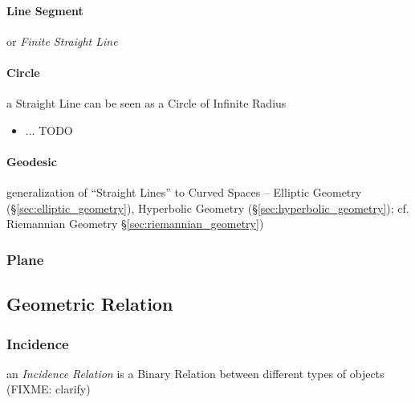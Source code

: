 \paragraph{Line Segment}\label{sec:line_segment}\hfill

or \emph{Finite Straight Line}



\paragraph{Circle}\label{sec:circle}\hfill

a Straight Line can be seen as a Circle of Infinite Radius

\begin{itemize}
  \item ... TODO
\end{itemize}



\paragraph{Geodesic}\label{sec:geodesic}\hfill

generalization of ``Straight Lines'' to Curved Spaces -- Elliptic Geometry
(\S\ref{sec:elliptic_geometry}), Hyperbolic Geometry
(\S\ref{sec:hyperbolic_geometry}); cf. Riemannian Geometry
\S\ref{sec:riemannian_geometry})



\subsubsection{Plane}\label{sec:plane}



\subsection{Geometric Relation}\label{sec:geometric_relation}

\subsubsection{Incidence}\label{sec:incidence}

an \emph{Incidence Relation} is a Binary Relation between different types of
objects (FIXME: clarify)


